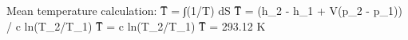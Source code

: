 Mean temperature calculation:  
T̅ = ∫(1/T) dS  
T̅ = (h_2 - h_1 + V(p_2 - p_1)) / c ln(T_2/T_1)  
T̅ = c ln(T_2/T_1)  
T̅ = 293.12 K
